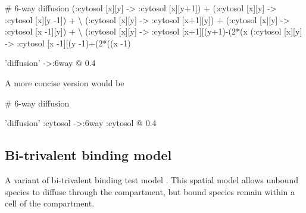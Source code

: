 \begin{kappasource}


# 6-way diffusion
    (:cytosol [x][y] -> :cytosol [x][y+1]) + (:cytosol [x][y] -> :cytosol [x][y -1]) + {\textbackslash}
    (:cytosol [x][y] -> :cytosol [x+1][y]) + (:cytosol [x][y] -> :cytosol [x -1][y]) + {\textbackslash}
    (:cytosol [x][y] -> :cytosol [x+1][(y+1)-(2*(x%
    (:cytosol [x][y] -> :cytosol [x -1][(y -1)+(2*((x -1)%

'diffusion' ->:6way @ 0.4


\end{kappasource}

A more concise version would be

\begin{kappasource}


# 6-way diffusion

'diffusion' :cytosol ->:6way :cytosol @ 0.4


\end{kappasource}


\subsection{Bi-trivalent binding model}
\label{sec:bitrivalent}


A variant of bi-trivalent binding test model \citep{yang2008kinetic}. This spatial model allows unbound species to diffuse through the compartment, but bound species remain within a cell of the compartment.


